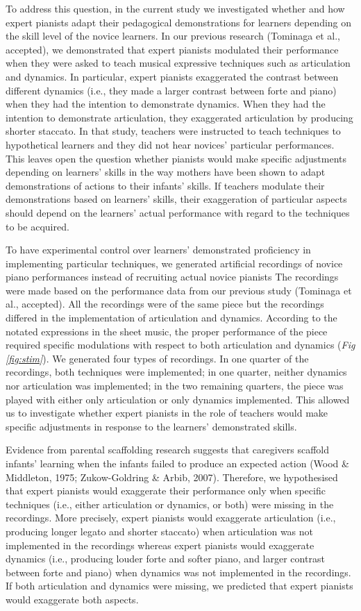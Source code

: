 \documentclass[
  man,floatsintext]{apa6}
\begin{document}
To address this question, in the current study we investigated whether and how expert pianists adapt their pedagogical demonstrations for learners depending on the skill level of the novice learners. In our previous research (Tominaga et al., accepted), we demonstrated that expert pianists modulated their performance when they were asked to teach musical expressive techniques such as articulation and dynamics. In particular, expert pianists exaggerated the contrast between different dynamics (i.e., they made a larger contrast between forte and piano) when they had the intention to demonstrate dynamics. When they had the intention to demonstrate articulation, they exaggerated articulation by producing shorter staccato. In that study, teachers were instructed to teach techniques to hypothetical learners and they did not hear novices' particular performances. This leaves open the question whether pianists would make specific adjustments depending on learners' skills in the way mothers have been shown to adapt demonstrations of actions to their infants' skills. If teachers modulate their demonstrations based on learners' skills, their exaggeration of particular aspects should depend on the learners' actual performance with regard to the techniques to be acquired.

To have experimental control over learners' demonstrated proficiency in implementing particular techniques, we generated artificial recordings of novice piano performances instead of recruiting actual novice pianists The recordings were made based on the performance data from our previous study (Tominaga et al., accepted). All the recordings were of the same piece but the recordings differed in the implementation of articulation and dynamics. According to the notated expressions in the sheet music, the proper performance of the piece required specific modulations with respect to both articulation and dynamics (\emph{Fig \ref{fig:stim}}). We generated four types of recordings. In one quarter of the recordings, both techniques were implemented; in one quarter, neither dynamics nor articulation was implemented; in the two remaining quarters, the piece was played with either only articulation or only dynamics implemented. This allowed us to investigate whether expert pianists in the role of teachers would make specific adjustments in response to the learners' demonstrated skills.

Evidence from parental scaffolding research suggests that caregivers scaffold infants' learning when the infants failed to produce an expected action (Wood \& Middleton, 1975; Zukow-Goldring \& Arbib, 2007). Therefore, we hypothesised that expert pianists would exaggerate their performance only when specific techniques (i.e., either articulation or dynamics, or both) were missing in the recordings. More precisely, expert pianists would exaggerate articulation (i.e., producing longer legato and shorter staccato) when articulation was not implemented in the recordings whereas expert pianists would exaggerate dynamics (i.e., producing louder forte and softer piano, and larger contrast between forte and piano) when dynamics was not implemented in the recordings. If both articulation and dynamics were missing, we predicted that expert pianists would exaggerate both aspects.
\end{document}
